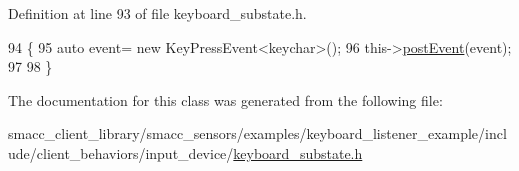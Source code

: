 Definition at line 93 of file keyboard\+\_\+substate.\+h.


\begin{DoxyCode}
94   \{
95     \textcolor{keyword}{auto} \textcolor{keyword}{event}= \textcolor{keyword}{new} KeyPressEvent<keychar>();
96     this->\hyperlink{classsmacc_1_1SmaccClientBehavior_ab29b23145ea074ad69340fc0af6fbb75}{postEvent}(event);
97 
98   \}      
\end{DoxyCode}


The documentation for this class was generated from the following file\+:\begin{DoxyCompactItemize}
\item 
smacc\+\_\+client\+\_\+library/smacc\+\_\+sensors/examples/keyboard\+\_\+listener\+\_\+example/include/client\+\_\+behaviors/input\+\_\+device/\hyperlink{keyboard__substate_8h}{keyboard\+\_\+substate.\+h}\end{DoxyCompactItemize}
